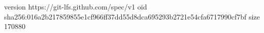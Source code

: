 version https://git-lfs.github.com/spec/v1
oid sha256:016a2b217859855e1cf966ff37dd55d8dca695293b2721e54cfa6717990cf7bf
size 170880

